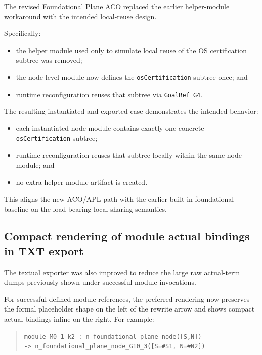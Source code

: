\documentclass[12pt,twoside,a4paper]{article}
\begin{document}
The revised Foundational Plane ACO replaced the earlier helper-module
workaround with the intended local-reuse design.

Specifically:

\begin{itemize}
\item the helper module used only to simulate local reuse of the OS
      certification subtree was removed;
\item the node-level module now defines the \texttt{osCertification} subtree
      once; and
\item runtime reconfiguration reuses that subtree via \texttt{GoalRef G4}.
\end{itemize}

The resulting instantiated and exported case demonstrates the intended
behavior:

\begin{itemize}
\item each instantiated node module contains exactly one concrete
      \texttt{osCertification} subtree;
\item runtime reconfiguration reuses that subtree locally within the same node
      module; and
\item no extra helper-module artifact is created.
\end{itemize}

This aligns the new ACO/APL path with the earlier built-in foundational
baseline on the load-bearing local-sharing semantics.

\subsection{Compact rendering of module actual bindings in TXT export}

The textual exporter was also improved to reduce the large raw actual-term
dumps previously shown under successful module invocations.

For successful defined module references, the preferred rendering now preserves
the formal placeholder shape on the left of the rewrite arrow and shows compact
actual bindings inline on the right. For example:

\begin{quote}
\texttt{module M0\_1\_k2 : n\_foundational\_plane\_node([S,N]) \\
\hspace*{2em}-> n\_foundational\_plane\_node\_G10\_3([S=\#S1, N=\#N2])}
\end{quote}
\end{document}
